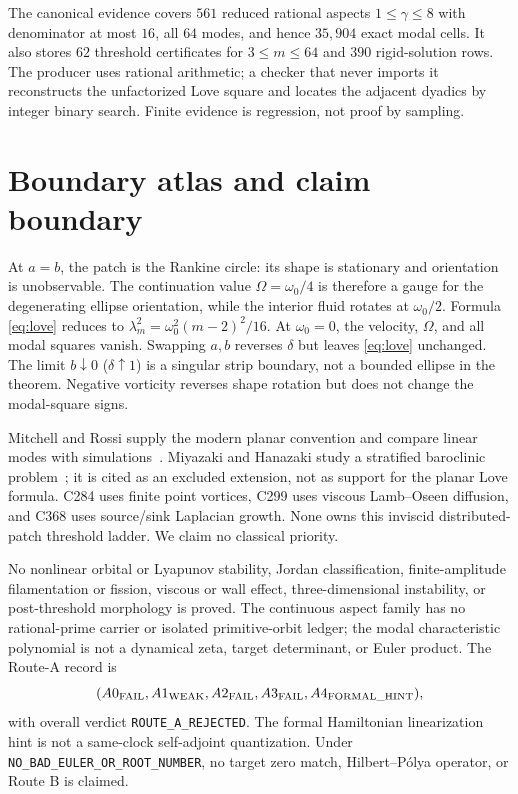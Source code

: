\documentclass[10pt]{article}
\newcommand{\Scope}{\texttt{NO\_BAD\_EULER\_OR\_ROOT\_NUMBER}}
\begin{document}
The canonical evidence covers $561$ reduced rational aspects
$1\le\gamma\le8$ with denominator at most $16$, all $64$ modes, and hence
$35{,}904$ exact modal cells.  It also stores $62$ threshold certificates
for $3\le m\le64$ and $390$ rigid-solution rows.  The producer uses rational
arithmetic; a checker that never imports it reconstructs the unfactorized
Love square and locates the adjacent dyadics by integer binary search.
Finite evidence is regression, not proof by sampling.

\section{Boundary atlas and claim boundary}
At $a=b$, the patch is the Rankine circle: its shape is stationary and
orientation is unobservable.  The continuation value $\Omega=\omega_0/4$
is therefore a gauge for the degenerating ellipse orientation, while the
interior fluid rotates at $\omega_0/2$.  Formula \eqref{eq:love} reduces to
$\lambda_m^2=\omega_0^2(m-2)^2/16$.  At $\omega_0=0$, the velocity,
$\Omega$, and all modal squares vanish.  Swapping $a,b$ reverses $\delta$
but leaves \eqref{eq:love} unchanged.  The limit $b\downarrow0$
($\delta\uparrow1$) is a singular strip boundary, not a bounded ellipse in
the theorem.  Negative vorticity reverses shape rotation but does not change
the modal-square signs.

Mitchell and Rossi supply the modern planar convention and compare linear
modes with simulations~\cite{MitchellRossi}.  Miyazaki and Hanazaki study a
stratified baroclinic problem~\cite{MiyazakiHanazaki}; it is cited as an
excluded extension, not as support for the planar Love formula.  C284 uses
finite point vortices, C299 uses viscous Lamb--Oseen diffusion, and C368 uses
source/sink Laplacian growth.  None owns this inviscid distributed-patch
threshold ladder.  We claim no classical priority.

No nonlinear orbital or Lyapunov stability, Jordan classification,
finite-amplitude filamentation or fission, viscous or wall effect,
three-dimensional instability, or post-threshold morphology is proved.
The continuous aspect family has no rational-prime carrier or isolated
primitive-orbit ledger; the modal characteristic polynomial is not a
dynamical zeta, target determinant, or Euler product.  The Route-A record is
\[
 (A0_{\rm FAIL},A1_{\rm WEAK},A2_{\rm FAIL},A3_{\rm FAIL},
 A4_{\rm FORMAL\_HINT}),
\]
with overall verdict \texttt{ROUTE\_A\_REJECTED}.  The formal Hamiltonian
linearization hint is not a same-clock self-adjoint quantization.  Under
\Scope, no target zero match, Hilbert--P\'olya operator, or Route B is
claimed.
\fi
\end{document}
